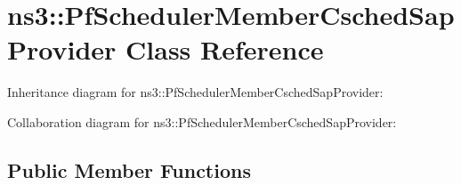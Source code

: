 \hypertarget{classns3_1_1PfSchedulerMemberCschedSapProvider}{}\section{ns3\+:\+:Pf\+Scheduler\+Member\+Csched\+Sap\+Provider Class Reference}
\label{classns3_1_1PfSchedulerMemberCschedSapProvider}


Inheritance diagram for ns3\+:\+:Pf\+Scheduler\+Member\+Csched\+Sap\+Provider\+:


Collaboration diagram for ns3\+:\+:Pf\+Scheduler\+Member\+Csched\+Sap\+Provider\+:
\subsection*{Public Member Functions}
